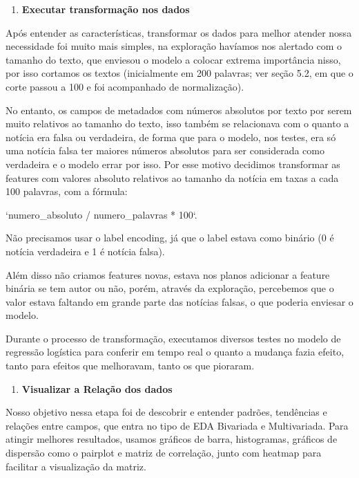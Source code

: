 \documentclass[
  brazilian,
  11pt,
]{article}
\providecommand{\tightlist}{%
  \setlength{\itemsep}{0pt}\setlength{\parskip}{0pt}}
\begin{document}
\begin{enumerate}
\def\labelenumi{\arabic{enumi}.}
\tightlist
\item
  \textbf{Executar transformação nos dados}
\end{enumerate}

Após entender as características, transformar os dados para melhor atender nossa necessidade foi muito mais simples, na exploração havíamos nos alertado com o tamanho do texto, que enviesou o modelo a colocar extrema importância nisso, por isso cortamos os textos (inicialmente em 200 palavras; ver seção 5.2, em que o corte passou a 100 e foi acompanhado de normalização).

No entanto, os campos de metadados com números absolutos por texto por serem muito relativos ao tamanho do texto, isso também se relacionava com o quanto a notícia era falsa ou verdadeira, de forma que para o modelo, nos testes, era só uma notícia falsa ter maiores números absolutos para ser considerada como verdadeira e o modelo errar por isso. Por esse motivo decidimos transformar as features com valores absoluto relativos ao tamanho da notícia em taxas a cada 100 palavras, com a fórmula:

`numero\_absoluto / numero\_palavras * 100`.

Não precisamos usar o label encoding, já que o label estava como binário (0 é notícia verdadeira e 1 é notícia falsa).

Além disso não criamos features novas, estava nos planos adicionar a feature binária se tem autor ou não, porém, através da exploração, percebemos que o valor estava faltando em grande parte das notícias falsas, o que poderia enviesar o modelo.

Durante o processo de transformação, executamos diversos testes no modelo de regressão logística para conferir em tempo real o quanto a mudança fazia efeito, tanto para efeitos que melhoravam, tanto os que pioraram.

\begin{enumerate}
\def\labelenumi{\arabic{enumi}.}
\tightlist
\item
  \textbf{Visualizar a Relação dos dados}
\end{enumerate}

Nosso objetivo nessa etapa foi de descobrir e entender padrões, tendências e relações entre campos, que entra no tipo de EDA Bivariada e Multivariada. Para atingir melhores resultados, usamos gráficos de barra, histogramas, gráficos de dispersão como o pairplot e matriz de correlação, junto com heatmap para facilitar a visualização da matriz.
\end{document}
